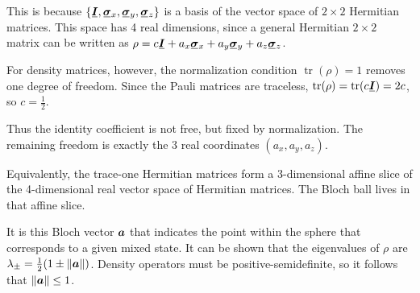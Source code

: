 


\begin{digression}
This is because $\{\matr{I}, \matr{\sigma}_x, \matr{\sigma}_y, \matr{\sigma}_z\}$ is a basis of the vector space of $2\times 2$ Hermitian matrices.
This space has 4 real dimensions, since a general Hermitian $2\times2$ matrix can be written as
$
\rho
=
c \matr{I} + a_x \matr{\sigma}_x + a_y \matr{\sigma}_y + a_z \matr{\sigma}_z
$.

For density matrices, however, the normalization condition
$
\operatorname{tr}(\rho)=1
$
removes one degree of freedom.
Since the Pauli matrices are traceless,
$
\operatorname{tr}(\rho)
=
\operatorname{tr}(c\matr{I})
=
2c
$,
so
$
c=\frac12
$.

Thus the identity coefficient is not free, but fixed by normalization.
The remaining freedom is exactly the 3 real coordinates
$(a_x,a_y,a_z)$.

Equivalently, the trace-one Hermitian matrices form a 3-dimensional affine slice of the 4-dimensional real vector space of Hermitian matrices.
The Bloch ball lives in that affine slice.
\end{digression}

It is this Bloch vector ${\boldsymbol{a}}$ that indicates the point within the sphere that corresponds to a given mixed state. 
It can be shown that
the eigenvalues of $\rho$ are $\lambda_{\pm} = \frac{1}{2}(1 \pm \|{\boldsymbol{a}}\|)$. 
Density operators must be positive-semidefinite, so it follows that $\|{\boldsymbol{a}}\| \leq 1$.

